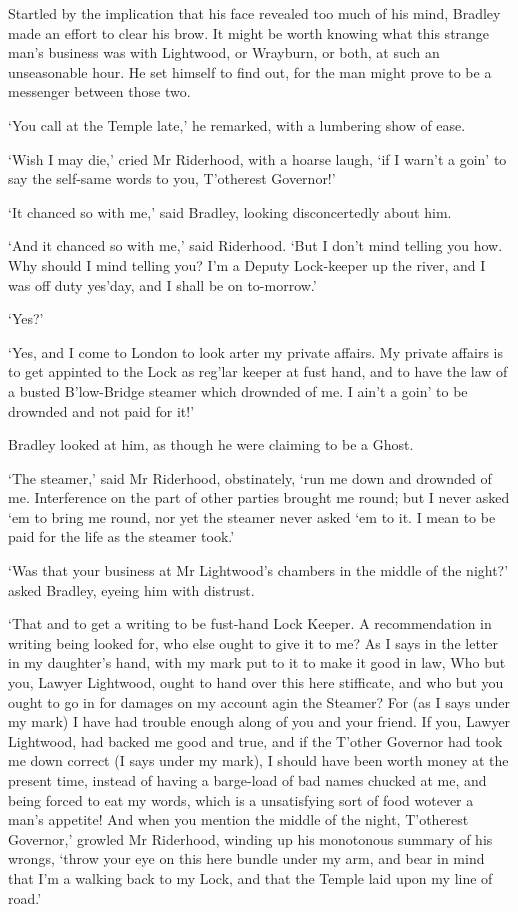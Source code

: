 Startled by the implication that his face revealed too much of his mind,
Bradley made an effort to clear his brow. It might be worth knowing what
this strange man’s business was with Lightwood, or Wrayburn, or both, at
such an unseasonable hour. He set himself to find out, for the man might
prove to be a messenger between those two.

‘You call at the Temple late,’ he remarked, with a lumbering show of
ease.

‘Wish I may die,’ cried Mr Riderhood, with a hoarse laugh, ‘if I warn’t
a goin’ to say the self-same words to you, T’otherest Governor!’

‘It chanced so with me,’ said Bradley, looking disconcertedly about him.

‘And it chanced so with me,’ said Riderhood. ‘But I don’t mind telling
you how. Why should I mind telling you? I’m a Deputy Lock-keeper up the
river, and I was off duty yes’day, and I shall be on to-morrow.’

‘Yes?’

‘Yes, and I come to London to look arter my private affairs. My private
affairs is to get appinted to the Lock as reg’lar keeper at fust hand,
and to have the law of a busted B’low-Bridge steamer which drownded of
me. I ain’t a goin’ to be drownded and not paid for it!’

Bradley looked at him, as though he were claiming to be a Ghost.

‘The steamer,’ said Mr Riderhood, obstinately, ‘run me down and drownded
of me. Interference on the part of other parties brought me round; but
I never asked ‘em to bring me round, nor yet the steamer never asked ‘em
to it. I mean to be paid for the life as the steamer took.’

‘Was that your business at Mr Lightwood’s chambers in the middle of the
night?’ asked Bradley, eyeing him with distrust.

‘That and to get a writing to be fust-hand Lock Keeper. A recommendation
in writing being looked for, who else ought to give it to me? As I says
in the letter in my daughter’s hand, with my mark put to it to make it
good in law, Who but you, Lawyer Lightwood, ought to hand over this here
stifficate, and who but you ought to go in for damages on my account
agin the Steamer? For (as I says under my mark) I have had trouble
enough along of you and your friend. If you, Lawyer Lightwood, had
backed me good and true, and if the T’other Governor had took me down
correct (I says under my mark), I should have been worth money at the
present time, instead of having a barge-load of bad names chucked at me,
and being forced to eat my words, which is a unsatisfying sort of food
wotever a man’s appetite! And when you mention the middle of the night,
T’otherest Governor,’ growled Mr Riderhood, winding up his monotonous
summary of his wrongs, ‘throw your eye on this here bundle under my arm,
and bear in mind that I’m a walking back to my Lock, and that the Temple
laid upon my line of road.’

